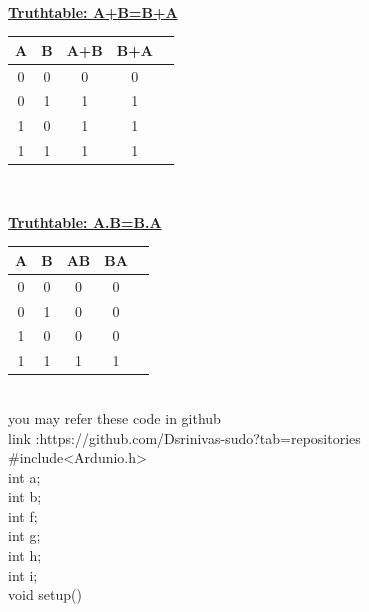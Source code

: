 \documentclass[letterpaper, 10 pt, conference]{ieeeconf}
\begin{document}
\begin{left}
\vspace{5cm}
\\ \raggedright \textbf{\underline{Truthtable: A+B=B+A}}\vspace{2mm}
\begin{table}[ht]
\centering %
\begin{tabular}{c c c c c} %
\hline\hline %
 \textbf{A} & \textbf{B} & \textbf{A+B} &\textbf{B+A}\\ [0.5ex] %
\hline
      0 & 0 & 0 & 0\\
      0 & 1 & 1 & 1\\
      1 & 0 & 1 & 1\\
      1 & 1 & 1 & 1\\
\hline
\end{tabular}
\end{table}
\vspace{2cm}
\\ \raggedright \textbf{\underline{Truthtable: A.B=B.A}}\vspace{2mm}
\begin{table}[ht]
\centering %
\begin{tabular}{c c c c c} %
\hline\hline %
  \textbf{A} & \textbf{B} & \textbf{AB} &\textbf{BA}\\ [0.5ex] %
\hline
      0 & 0 & 0 & 0\\
      0 & 1 & 0 & 0\\
      1 & 0 & 0 & 0\\
      1 & 1 & 1 & 1\\
\hline
\end{tabular}
\end{table}
\raggedright \textbf{\underline{}}\vspace{7mm}
\\you may  refer these code in github
\\ link    :https://github.com/Dsrinivas-sudo?tab=repositories
\vspace{2cm}
\\ #include<Ardunio.h>
\\int a;
\\int b;
\\int f;
\\int g;
\\int h;
\\int i;
\\void setup()
\\{
}
\end{left}
\end{document}
